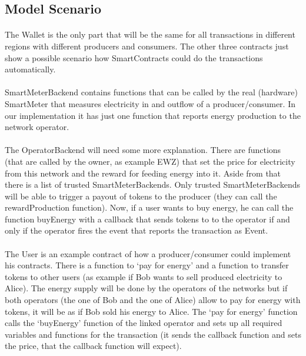 \documentclass{scrartcl}
\begin{document}
	\subsection{Model Scenario}
	
	\paragraph{}
	The Wallet is the only part that will be the same for all transactions in different regions with different producers and consumers. The other three contracts just show a possible scenario how SmartContracts could do the transactions automatically.
	
	\paragraph{}
	SmartMeterBackend contains functions that can be called by the real (hardware) SmartMeter that measures electricity in and outflow of a producer/consumer. In our implementation it has just one function that reports energy production to the network operator.
	
	\paragraph{}
	The OperatorBackend will need some more explanation. There are functions (that are called by the owner, as example EWZ) that set the price for electricity from this network and the reward for feeding energy into it. Aside from that there is a list of trusted SmartMeterBackends. Only trusted SmartMeterBackends will be able to trigger a payout of tokens to the producer (they can call the rewardProduction function). Now, if a user wants to buy energy, he can call the function buyEnergy with a callback that sends tokens to to the operator if and only if the operator fires the event that reports the transaction as Event.
	
	\paragraph{}
	The User is an example contract of how a producer/consumer could implement his contracts. There is a function to ‘pay for energy’ and a function to transfer tokens to other users (as example if Bob wants to sell produced electricity to Alice). The energy supply will be done by the operators of the networks but if both operators (the one of Bob and the one of Alice) allow to pay for energy with tokens, it will be as if Bob sold his energy to Alice. The ‘pay for energy’ function calls the ‘buyEnergy’ function of the linked operator and sets up all required variables and functions for the transaction (it sends the callback function and sets the price, that the callback function will expect).
	
\end{document}
